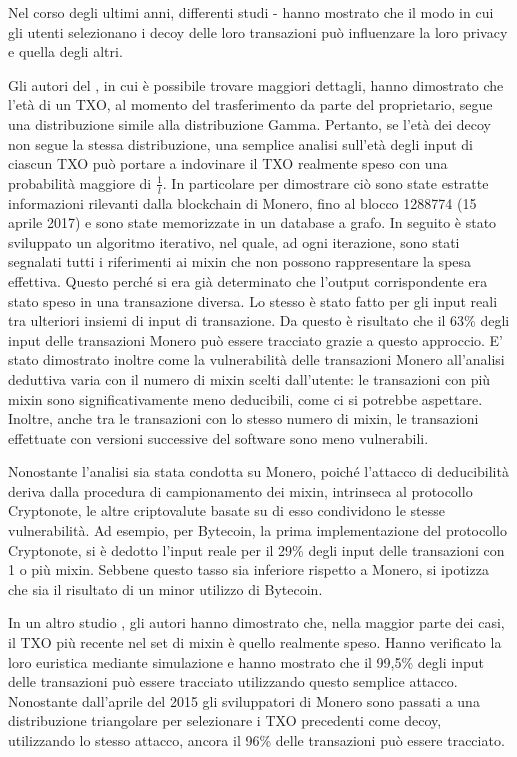 Nel corso degli ultimi anni, differenti studi  \cite{ref4}-\cite{ref5} hanno mostrato che il modo in cui gli utenti selezionano i decoy delle loro transazioni può influenzare la loro privacy e quella degli altri.

Gli autori del \cite{ref4}, in cui è possibile trovare maggiori dettagli, hanno dimostrato che l'età di un TXO, al momento del trasferimento da parte del proprietario, segue una distribuzione simile alla distribuzione Gamma. Pertanto, se l'età dei decoy non segue la stessa distribuzione, una semplice analisi sull'età degli input di ciascun TXO può portare a indovinare il TXO realmente speso con una probabilità maggiore di $\frac{1}{l}$. In particolare per dimostrare ciò sono state estratte informazioni rilevanti dalla blockchain di Monero, fino al blocco 1288774 (15 aprile 2017) e sono state memorizzate in un database a grafo. In seguito è stato sviluppato un algoritmo iterativo, nel quale, ad ogni iterazione, sono stati segnalati tutti i riferimenti ai mixin che non possono rappresentare la spesa effettiva. Questo perché si era già determinato che l'output corrispondente era stato speso in una transazione diversa. Lo stesso è stato fatto per gli input reali tra ulteriori insiemi di input di transazione. Da questo è risultato che il 63\% degli input delle transazioni Monero può essere tracciato grazie a questo approccio. E' stato dimostrato inoltre come la vulnerabilità delle transazioni Monero all'analisi deduttiva varia con il numero di mixin scelti dall'utente: le transazioni con più mixin sono significativamente meno deducibili, come ci si potrebbe aspettare. Inoltre, anche tra le transazioni con lo stesso numero di mixin, le transazioni effettuate con versioni successive del software sono meno vulnerabili.

Nonostante l'analisi sia stata condotta su Monero, poiché l'attacco di deducibilità deriva dalla procedura di campionamento dei mixin, intrinseca al protocollo Cryptonote, le altre criptovalute basate su di esso condividono le stesse vulnerabilità. Ad esempio, per Bytecoin, la prima implementazione del protocollo Cryptonote, si è dedotto l'input reale per il 29\% degli input delle transazioni con 1 o più mixin. Sebbene questo tasso sia inferiore rispetto a Monero, si ipotizza che sia il risultato di un minor utilizzo di Bytecoin.

In un altro studio \cite{ref2}, gli autori hanno dimostrato che, nella maggior parte dei casi, il TXO più recente nel set di mixin è quello realmente speso. Hanno verificato la loro euristica mediante simulazione e hanno mostrato che il 99,5\% degli input delle transazioni può essere tracciato utilizzando questo semplice attacco. Nonostante dall'aprile del 2015 gli sviluppatori di Monero sono passati a una distribuzione triangolare per selezionare i TXO precedenti come decoy, utilizzando lo stesso attacco, ancora il 96\% delle transazioni può essere tracciato. 


